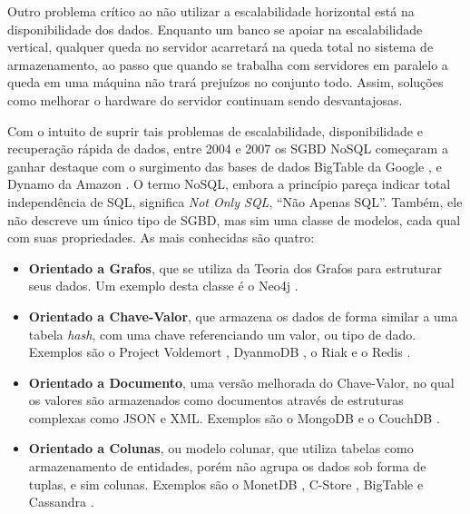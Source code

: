 Outro problema crítico ao não utilizar a escalabilidade horizontal está na 
disponibilidade dos dados. Enquanto um banco se apoiar na escalabilidade vertical, 
qualquer queda no servidor acarretará na queda total no sistema de armazenamento, 
ao passo que quando se trabalha com servidores em paralelo a queda em uma máquina 
não trará prejuízos no conjunto todo. Assim, soluções como melhorar o hardware do 
servidor continuam sendo desvantajosas. 

Com o intuito de suprir tais problemas de escalabilidade, disponibilidade 
e recuperação rápida de dados, entre 2004 e 2007 os SGBD NoSQL começaram 
a ganhar destaque com o surgimento das bases de dados BigTable da Google \cite{chang2008bigtable}, e Dynamo 
da Amazon \cite{decandia2007dynamo}. O termo NoSQL, embora a princípio pareça indicar total independência 
de SQL, significa \textit{Not Only SQL}, “Não Apenas SQL”. Também, ele não descreve um 
único tipo de SGBD, mas sim uma classe de modelos, cada qual com suas propriedades. 
As mais conhecidas são quatro:

\begin{itemize}
    \item{\textbf{Orientado a Grafos}}, que se utiliza da Teoria dos Grafos para estruturar seus dados. 
    Um exemplo desta classe é o Neo4j \cite{neo2018nosql}.
    \item{\textbf{Orientado a Chave-Valor}}, que armazena os dados de forma similar a uma tabela \textit{hash}, 
    com uma chave referenciando um valor, ou tipo de dado. Exemplos são o Project Voldemort \cite{voldemort2018nosql}, 
    DyanmoDB \cite{amazon2018nosql}, o Riak \cite{riak2018nosql} e o Redis \cite{redis2018nosql}.
    \item{\textbf{Orientado a Documento}}, uma versão melhorada do Chave-Valor, 
    no qual os valores são armazenados como documentos através de estruturas complexas como JSON e XML. 
    Exemplos são o MongoDB \cite{mongo2018nosql} e o CouchDB \cite{couch2018nosql}.
    \item{\textbf{Orientado a Colunas}}, ou modelo colunar, 
    que utiliza tabelas como armazenamento de entidades, 
    porém não agrupa os dados sob forma de tuplas, e sim colunas. Exemplos são o MonetDB \cite{monetdb2017c}, C-Store \cite{cstore2018nosql}, BigTable \cite{google2018nosql} e Cassandra \cite{cassandra2018nosql}.
\end{itemize}


